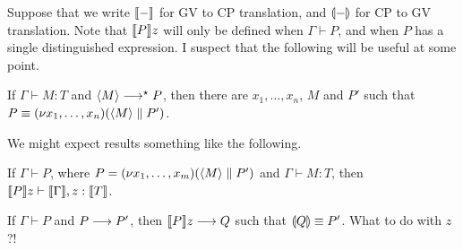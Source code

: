 \documentclass[orivec,envcountsame]{llncs}
\begin{document}
Suppose that we write $\llbracket - \rrbracket$ for GV to CP translation, and $\llparenthesis - \rrparenthesis$ for CP to GV translation.
Note that $\llbracket P \rrbracket z$ will only be defined when $\Gamma \vdash P$, and when $P$ has a single
distinguished expression.  I suspect that the following will be useful at some point.
\begin{lemma}
  If $\Gamma \vdash M: T$ and $\langle M \rangle \longrightarrow^\star P$, then there are $x_1,\dots,x_n$, $M$ and $P'$
  such that $P \equiv (\nu x_1,\dots,x_n)(\langle M \rangle \parallel P')$.
\end{lemma}

We might expect results something like the following.

\begin{theorem}
  If $\Gamma \vdash P$, where $P = (\nu x_1,\dots,x_m)(\langle M \rangle \parallel P')$ and $\Gamma
  \vdash M: T$, then $\llbracket P \rrbracket z \vdash \llbracket \Gamma \rrbracket, z:\llbracket T \rrbracket$.
\end{theorem}

\begin{theorem}
  If $\Gamma \vdash P$ and $P \longrightarrow P'$, then $\llbracket P \rrbracket z \longrightarrow Q$ such that $\llparenthesis Q \rrparenthesis
  \equiv P'$.  What to do with $z$?!
\end{theorem}
\end{document}
